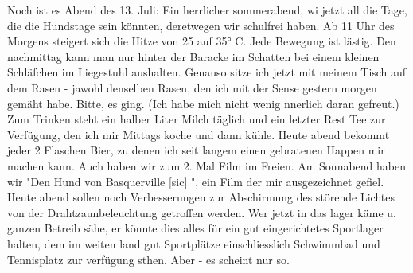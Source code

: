 \def\day{{\color{red} [neue Seite ohne Seitenangabe, 13.7.42 Abend] }}
\mktitle

Noch ist es Abend des 13. Juli: Ein herrlicher sommerabend, wi jetzt all die Tage, die die Hundstage sein k\"{o}nnten, deretwegen wir schulfrei haben.
Ab 11 Uhr des Morgens steigert sich die Hitze von 25 auf 35° C.
Jede Bewegung ist l\"{a}stig.
Den nachmittag kann man nur hinter der Baracke im Schatten bei einem kleinen Schl\"{a}fchen im Liegestuhl aushalten.
Genauso sitze ich jetzt mit meinem Tisch auf dem Rasen - jawohl denselben Rasen, den ich mit der Sense gestern morgen gem\"{a}ht habe.
Bitte, es ging.
(Ich habe mich nicht wenig nnerlich daran gefreut.)
Zum Trinken steht ein halber Liter Milch t\"{a}glich und ein letzter Rest Tee zur Verf\"{u}gung, den ich mir Mittags koche und dann k\"{u}hle.
Heute abend bekommt jeder 2 Flaschen Bier, zu denen ich seit langem einen gebratenen Happen mir machen kann.
Auch haben wir zum 2. Mal Film im Freien.
Am Sonnabend haben wir "Den Hund von Basquerville{\color{red} [sic] }", ein Film der mir ausgezeichnet gefiel.
Heute abend sollen noch Verbesserungen zur Abschirmung des st\"{o}rende Lichtes von der Drahtzaunbeleuchtung getroffen werden.
Wer jetzt in das lager k\"{a}me u. ganzen Betreib s\"{a}he, er k\"{o}nnte dies alles f\"{u}r ein gut eingerichtetes Sportlager halten, dem im weiten land gut Sportpl\"{a}tze einschliesslich Schwimmbad und Tennisplatz zur verf\"{u}gung sthen.
Aber - es scheint nur so.

\clearpage
